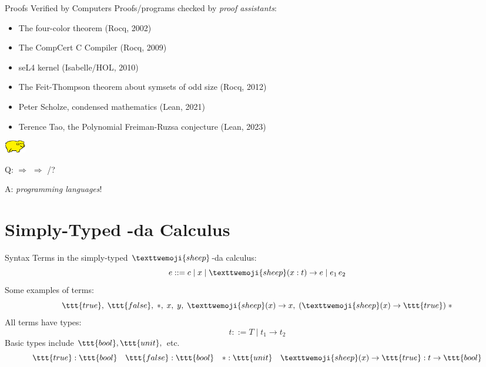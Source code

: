 \documentclass{beamer}
\newcommand{\lamb}{\texttwemoji{sheep}}
\begin{document}
\begin{frame}{Proofs Verified by Computers}
 \small{Proofs/programs checked by \emph{proof assistants}:}
 \pause
 \begin{itemize}
   \item The four-color theorem (Rocq, 2002) 
   \item The CompCert C Compiler (Rocq, 2009)
   \item seL4 kernel (Isabelle/HOL, 2010)
   \item The Feit-Thompson theorem about symsets of odd
     size (Rocq, 2012) \pause 
   \item Peter Scholze, condensed mathematics (Lean, 2021)
   \item Terence Tao, the Polynomial Freiman-Ruzsa conjecture (Lean, 2023)
 \end{itemize}
\end{frame}

\begin{frame}{\includegraphics[width=26pt]{yellowPig.png}}
  \begin{center}
    \Huge{Q:  $\Rightarrow$  $\Rightarrow$ /?}
\pause 
\vspace{1em}

    \huge{A: \emph{programming
    languages}!}
  \end{center}
\end{frame}


\section{Simply-Typed \texorpdfstring{\lamb}{lamb}-da Calculus}

\begin{frame}{Syntax}
Terms in the simply-typed $\lamb$-da calculus:
\[
  e ::= c \mid x \mid \lamb(x:t) \to e \mid e_1 \, e_2 
\] 
Some examples of terms: 
\[
  \ttt{true},\; \ttt{false},\; *, \; x,\; y,\; \lamb(x) \to x, \; (\lamb(x) \to
  \ttt{true}) \; *
\]
\pause
All terms have types:
\[
  t ::= T \mid t_1 \to t_2
\]
Basic types include $\ttt{bool}, \ttt{unit},$ etc. 
\[
  \ttt{true} : \ttt{bool} \quad \ttt{false} : \ttt{bool} \quad * : \ttt{unit}
  \quad \lamb(x) \to \ttt{true} : t \to \ttt{bool}
\] 


\end{frame}
\end{document}

